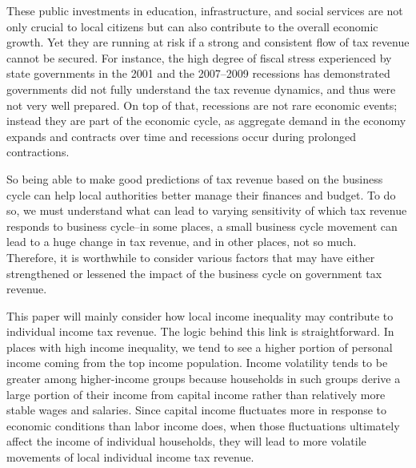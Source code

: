 \documentclass{article}
\begin{document}
These public investments in education, infrastructure, and social services are not only crucial to local citizens but can also contribute to the overall economic growth. Yet they are running at risk if a strong and consistent flow of tax revenue cannot be secured. For instance, the high degree of fiscal stress experienced by state governments in the 2001 and the 2007–2009 recessions has demonstrated governments did not fully understand the tax revenue dynamics, and thus were not very well prepared. On top of that, recessions are not rare economic events; instead they are part of the economic cycle, as aggregate demand in the economy expands and contracts over time and recessions occur during prolonged contractions. 

So being able to make good predictions of tax revenue based on the business cycle can help local authorities better manage their finances and budget. To do so, we must understand what can lead to varying sensitivity of which tax revenue responds to business cycle--in some places, a small business cycle movement can lead to a huge change in tax revenue, and in other places, not so much. Therefore, it is worthwhile to consider various factors that may have either strengthened or lessened the impact of the business cycle on government tax revenue. 

This paper will mainly consider how local income inequality may contribute to individual income tax revenue. The logic behind this link is straightforward. In places with high income inequality, we tend to see a higher portion of personal income coming from the top income population. Income volatility tends to be greater among higher-income groups because households in such groups derive a large portion of their income from capital income rather than relatively more stable wages and salaries. Since capital income fluctuates more in response to economic conditions than labor income does, when those fluctuations ultimately affect the income of individual households, they will lead to more volatile movements of local individual income tax revenue. 
\end{document}
